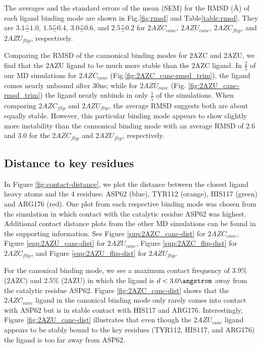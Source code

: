 The averages and the standard errors of the mean (SEM) for the RMSD ({\AA}) of each ligand binding mode are shown in Fig.\ref{fig:rmsd} and Table\ref{table:rmsd}.
They are $3.1 \frac{+}{-} 1.0$, $1.5 \frac{+}{-} 0.4$, $3.0 \frac{+}{-} 0.6$, and $2.5 \frac{+}{-} 0.2$ for $2AZC_{canc}$, $2AZU_{canc}$, $2AZC_{flip}$, and $2AZU_{flip}$, respectively.

Comparing the RMSD of the cannonical binding modes for 2AZC and 2AZU, we find that the 2AZU ligand to be much more stable than the 2AZC ligand.
In $\frac{2}{5}$ of our MD simulations for $2AZC_{canc}$ (Fig.\ref{fig:2AZC_canc-rmsd_trim}), the ligand comes nearly unbound after 30ns; while for $2AZU_{canc}$ (Fig. \ref{fig:2AZU_canc-rmsd_trim}) the ligand nearly unbinds in only $\frac{1}{5}$ of the simulations.
When comparing $2AZC_{flip}$ and $2AZU_{flip}$, the average RMSD suggests both are about equally stable.
However, this particular binding mode appears to show slightly more instability than the cannonical binding mode with an average RMSD of $2.6$ and $3.0$ for the $2AZC_{flip}$ and $2AZU_{flip}$, respectively.

\subsection{Distance to key residues}

In Figure \ref{fig:contact-distance}, we plot the distance between the closest ligand heavy atoms and the 4 residues: ASP62 (blue), TYR112 (orange), HIS117 (green) and ARG176 (red).
One plot from each respective binding mode was chosen from the simulation in which contact with the catalytic residue ASP62 was highest.
Additional contact distance plots from the other MD simulations can be found in the supporting information.
See Figure \ref{sup:2AZC_canc-dist} for $2AZC_{canc}$, Figure \ref{sup:2AZU_canc-dist} for $2AZU_{canc}$, Figure \ref{sup:2AZC_flip-dist} for $2AZC_{flip}$, and Figure \ref{sup:2AZU_flip-dist} for $2AZU_{flip}$.

For the canonical binding mode, we see a maximum contact frequency of 3.9\% (2AZC) and 2.5\% (2AZU) in which the ligand is $d<3.0\angstrom$ away from the catalytic residue ASP62.
Figure \ref{fig:2AZC_canc-dist} shows that the $2AZC_{canc}$ ligand in the canonical binding mode only rarely comes into contact with ASP62 but is in stable contact with HIS117 and ARG176.  
Interestingly, Figure \ref{fig:2AZU_canc-dist} illustrates that even though the $2AZU_{canc}$ ligand appears to be stably bound to the key residues (TYR112, HIS117, and ARG176) the ligand is too far away from ASP62.

